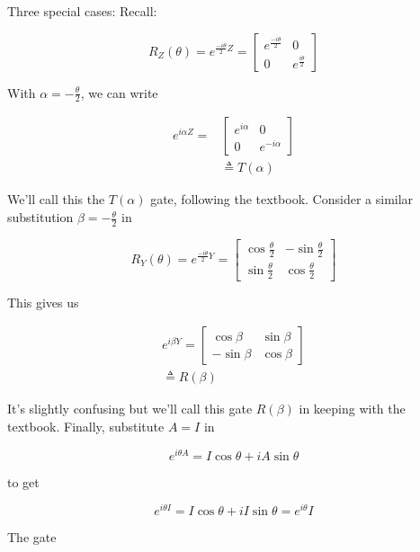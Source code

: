 \documentclass[main.tex]{subfiles}
\begin{document}
    Three special cases: Recall:
    
    $$
    R_{Z}(\theta)=e^{\frac{-i \theta}{2} Z}=\left[\begin{array}{cc}
    e^{\frac{-i \theta}{2}} & 0 \\
    0 & e^{\frac{i \theta}{2}}
    \end{array}\right]
    $$
    
    With $\alpha=-\frac{\theta}{2}$, we can write
    
    $$
    \begin{aligned}
    e^{i \alpha Z}=& {\left[\begin{array}{cc}
    e^{i \alpha} & 0 \\
    0 & e^{-i \alpha}
    \end{array}\right] } \\
    & \triangleq T(\alpha)
    \end{aligned}
    $$
    
    We'll call this the $T(\alpha)$ gate, following the textbook. Consider a similar substitution $\beta=-\frac{\theta}{2}$ in
    
    $$
    R_{Y}(\theta)=e^{\frac{-i \theta}{2} Y}=\left[\begin{array}{cc}
    \cos \frac{\theta}{2} & -\sin \frac{\theta}{2} \\
    \sin \frac{\theta}{2} & \cos \frac{\theta}{2}
    \end{array}\right]
    $$
    
    This gives us
    
    $$
    \begin{gathered}
    e^{i \beta Y}=\left[\begin{array}{cc}
    \cos \beta & \sin \beta \\
    -\sin \beta & \cos \beta
    \end{array}\right] \\
    \triangleq R(\beta)
    \end{gathered}
    $$
    
    It's slightly confusing but we'll call this gate $R(\beta)$ in keeping with the textbook. Finally, substitute $A=I$ in
    
    $$
    e^{i \theta A}=I \cos \theta+i A \sin \theta
    $$
    
    to get
    
    $$
    e^{i \theta I}=I \cos \theta+i I \sin \theta=e^{i \theta} I
    $$
    
    The gate
    
\end{document}
